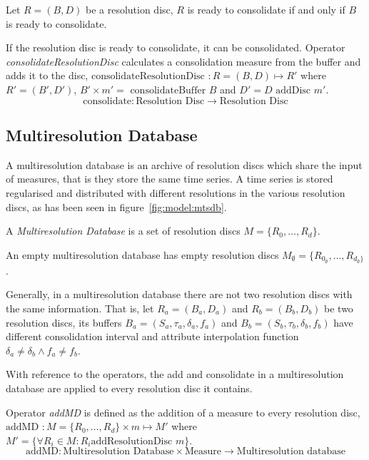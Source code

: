Let $R=(B,D)$ be a resolution disc, $R$ is ready to consolidate if and
only if $B$ is ready to consolidate.

If the resolution disc is ready to consolidate, it can be
consolidated.  Operator \emph{consolidateResolutionDisc} calculates a
consolidation measure from the buffer and adds it to the disc,
$\text{consolidateResolutionDisc } : R=(B,D) \mapsto R'$ where $R'=
(B',D')$, $B' \times m'= \text{ consolidateBuffer } B $ and $ D'= D
\text{ addDisc } m'$.
\[
\text{consolidate}: \text{Resolution Disc} \longrightarrow
\text{Resolution Disc}
\]




\subsection{Multiresolution Database}\label{sec:model:rrd}

A multiresolution database is an archive of resolution discs which
share the input of measures, that is they store the same time
series. A time series is stored regularised and distributed with
different resolutions in the various resolution discs, as has been seen
in figure~\ref{fig:model:mtsdb}.

\begin{definition}
  A \emph{Multiresolution Database} is a set of resolution discs
  $M=\{R_0,\dotsc,R_d\}$.
\end{definition}

An empty multiresolution database has empty resolution discs $M_{\emptyset}=\{R_{0_{\emptyset}},\dotsc,R_{d_{\emptyset}\}}$. 
 
Generally, in a multiresolution database there are not two resolution discs
with the same information. That is, let $R_a = (B_a, D_a)$ and $R_b =
(B_b, D_b)$ be two resolution discs, its buffers
$B_a=(S_a,\tau_a,\delta_a,f_a)$ and $B_b=(S_b,\tau_b,\delta_b,f_b)$
have different consolidation interval and attribute interpolation function
$\delta_a \neq \delta_b \wedge f_a \neq f_b$.


With reference to the operators, the add and consolidate in a
multiresolution database are applied to every resolution disc it
contains.


Operator \emph{addMD} is defined as the addition of a measure to every
resolution disc, $\text{addMD } : M=\{R_0,\dotsc,R_d\} \times m
\mapsto M' $ where $M'= \{ \forall R_i\in M: R_i \text{
  addResolutionDisc } m \}$.
\[
\text{addMD}: \text{Multiresolution Database} \times \text{Measure}
\longrightarrow \text{Multiresolution database}
\]


